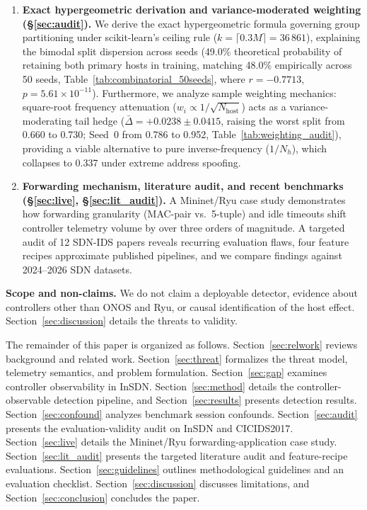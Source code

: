 \documentclass[journal]{IEEEtran}
\begin{document}
\begin{enumerate}
    \item \textbf{Exact hypergeometric derivation and variance-moderated weighting (\S\ref{sec:audit}).} We derive the exact hypergeometric formula governing group partitioning under scikit-learn's ceiling rule ($k=\lceil 0.3M \rceil = 36\,861$), explaining the bimodal split dispersion across seeds (49.0\% theoretical probability of retaining both primary hosts in training, matching 48.0\% empirically across 50 seeds, Table~\ref{tab:combinatorial_50seeds}, where $r=-0.7713$, $p=5.61\times 10^{-11}$). Furthermore, we analyze sample weighting mechanics: square-root frequency attenuation ($w_i \propto 1 / \sqrt{N_{\text{host}}}$) acts as a variance-moderating tail hedge ($\bar{\Delta} = +0.0238\pm0.0415$, raising the worst split from 0.660 to 0.730; Seed~0 from 0.786 to 0.952, Table~\ref{tab:weighting_audit}), providing a viable alternative to pure inverse-frequency ($1/N_h$), which collapses to 0.337 under extreme address spoofing.
    \item \textbf{Forwarding mechanism, literature audit, and recent benchmarks (\S\ref{sec:live}, \S\ref{sec:lit_audit}).} A Mininet/Ryu case study demonstrates how forwarding granularity (MAC-pair vs.\ 5-tuple) and idle timeouts shift controller telemetry volume by over three orders of magnitude. A targeted audit of 12 SDN-IDS papers reveals recurring evaluation flaws, four feature recipes approximate published pipelines, and we compare findings against 2024--2026 SDN datasets.
\end{enumerate}

\textbf{Scope and non-claims.} We do not claim a deployable detector, evidence about controllers other than ONOS and Ryu, or causal identification of the host effect. Section~\ref{sec:discussion} details the threats to validity.

The remainder of this paper is organized as follows. Section~\ref{sec:relwork} reviews background and related work. Section~\ref{sec:threat} formalizes the threat model, telemetry semantics, and problem formulation. Section~\ref{sec:gap} examines controller observability in InSDN. Section~\ref{sec:method} details the controller-observable detection pipeline, and Section~\ref{sec:results} presents detection results. Section~\ref{sec:confound} analyzes benchmark session confounds. Section~\ref{sec:audit} presents the evaluation-validity audit on InSDN and CICIDS2017. Section~\ref{sec:live} details the Mininet/Ryu forwarding-application case study. Section~\ref{sec:lit_audit} presents the targeted literature audit and feature-recipe evaluations. Section~\ref{sec:guidelines} outlines methodological guidelines and an evaluation checklist. Section~\ref{sec:discussion} discusses limitations, and Section~\ref{sec:conclusion} concludes the paper.
\end{document}
